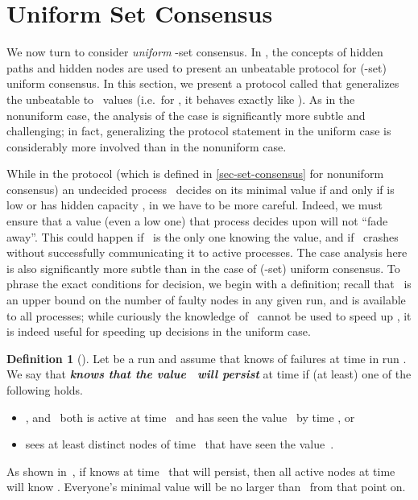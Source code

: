 \documentclass[11pt]{article}
\theoremstyle{definition}
\newtheorem{definition}{Definition}
\newcommand{\defemph}[1]{\textbf{\textit{#1}}}
\begin{document}
\section{Uniform Set Consensus}
\label{subsec-uni-k}

We now turn to consider {\em uniform} -set consensus.
In \cite{AYY-DISC}, the concepts of
hidden paths and hidden nodes
are used to present an unbeatable protocol  for (-set) uniform consensus.
In this section, we present a protocol called  that generalizes the unbeatable  to~ values (i.e.\ for , it behaves exactly like ).
As in the nonuniform case, the analysis of the case  is significantly more
subtle and challenging; in fact, generalizing the protocol statement in the uniform case is
considerably
more involved than in the nonuniform case.

While in the protocol  (which is defined in \cref{sec-set-consensus} for nonuniform consensus) an undecided process~ decides on its minimal value if and only if
 is low or has hidden capacity , in  we have to be more careful. Indeed, we must ensure that a value (even a low one) that process  decides upon  will not ``fade away''.
This could happen if~ is the only one knowing the value,  and if~ crashes without successfully communicating it to active processes.
The case analysis here is also significantly more subtle than in the case of (-set) uniform consensus. To phrase the exact conditions for decision, we begin with a definition; recall that~ is
an upper bound on the
number of faulty nodes in any given run, and is available to all processes; while curiously the knowledge of~ cannot be used to speed up , it is indeed useful for speeding up decisions in the uniform case.

\begin{definition}[\cite{AYY-DISC}]
Let  be a run and assume that  knows of  failures at time  in run . We say that   \defemph{knows that the value~ will persist} at time  if (at least) one of the following holds.
\begin{itemize}
\item
, and~ both is active at time~ and has seen the value~ by time , or
\item
 sees at least  distinct nodes  of time~ that have seen the value~.
\end{itemize}
\end{definition}
\noindent
As shown in~\cite{AYY-DISC}, if  knows at time~ that  will persist, then all active nodes at time~ will know .
Everyone's minimal value will be no larger than~ from that point on.
\end{document}
